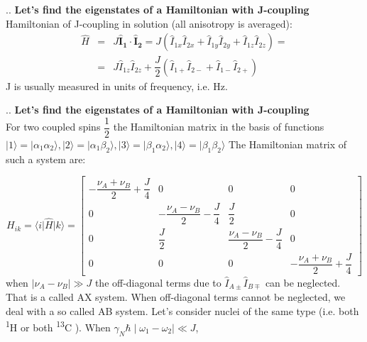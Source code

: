 \documentclass{beamer}
\begin{document}
\begin{frame}{\thesection.\thesubsection. \insertsubsection}
	\textbf{Let's find the eigenstates  of a Hamiltonian with J-coupling} \\
			Hamiltonian of J-coupling in solution (all anisotropy is averaged):
			\begin{equation}
			\begin{array}{lcl}
			\hat{H}  &=& J \bm{\hat{I}_{1}} \cdot  \bm{\hat{I}_{2}} = J ( \hat{I}_{1x} \hat{I}_{2x} + \hat{I}_{1y} \hat{I}_{2y} + \hat{I}_{1z} \hat{I}_{2z}   ) =	\\
			&=&  J  \hat{I}_{1z} \hat{I}_{2z} +\dfrac{J}{2} (\hat{I}_{1+} \hat{I}_{2-} + \hat{I}_{1-} \hat{I}_{2+} )  	  
			\end{array}
			\end{equation}
			J is usually measured in units of frequency, i.e. Hz. 
		
\end{frame}


\begin{frame}{\thesection.\thesubsection. \insertsubsection}
	\textbf{Let's find the eigenstates  of a Hamiltonian with J-coupling} \\
		For two coupled spins $\dfrac{1}{2}$ the Hamiltonian matrix in the basis of functions $\vert 1 \rangle =  \vert \alpha_1 \alpha_2 \rangle, \vert 2 \rangle =  \vert \alpha_1 \beta_2 \rangle, \vert 3 \rangle =  \vert \beta_1 \alpha_2 \rangle, \vert 4 \rangle =  \vert \beta_1 \beta_2 \rangle$
		The Hamiltonian matrix of such a system are:
		
		{\tiny
			\begin{equation}
			H_{ik}= \langle i \vert \hat{H} \vert k \rangle = 
			\begin{bmatrix}
			-\dfrac{\nu_A+ \nu_{B}  }{2} + \dfrac{J}{4}   & 0 & 0 & 0 \\
			0 & -\dfrac{\nu_A-\nu_B}{2} - \dfrac{J}{4}  & \dfrac{J}{2} & 0 \\
			0 & \dfrac{J}{2} & \dfrac{\nu_A-\nu_B}{2} - \dfrac{J}{4}  & 0 \\
			0 & 0 & 0 & -\dfrac{\nu_A+\nu_B}{2} + \dfrac{J}{4}                  
			\end{bmatrix}
			\end{equation}
		}%
		when $\mid \nu_A -\nu_B \mid \gg J $ the off-diagonal terms due to $\hat{I}_{A\pm} \hat{I}_{B\mp}$ can be neglected. That is a called \alert{AX system}. When off-diagonal terms cannot be neglected, we deal with a so called \alert{AB system}.
		Let's consider nuclei of the same type (i.e. both \textsuperscript{1}H or both \textsuperscript{13}C ). When $\gamma_N \hbar \mid \omega_1 -\omega_2 \mid \ll J $,
\end{frame}
\end{document}
